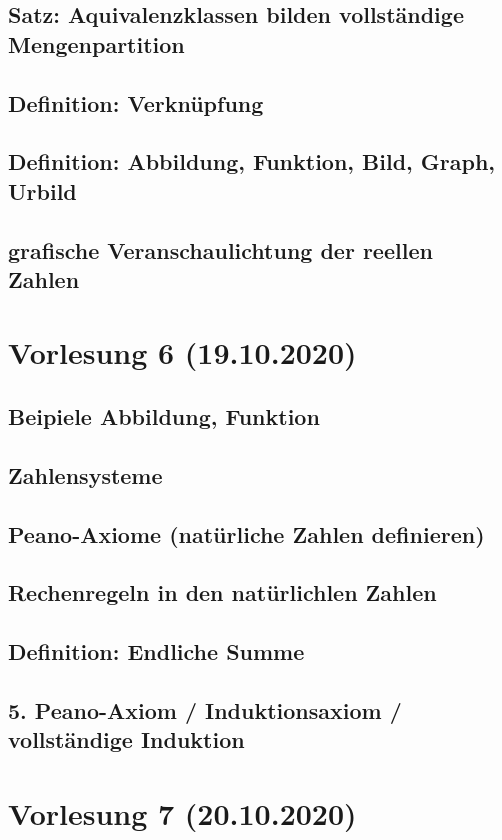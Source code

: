 \documentclass[]{article}
\begin{document}
\subsection{Satz: Aquivalenzklassen bilden vollständige Mengenpartition}
\subsection{Definition: Verknüpfung}
\subsection{Definition: Abbildung, Funktion, Bild, Graph, Urbild}
\subsection{grafische Veranschaulichtung der reellen Zahlen}


\section{Vorlesung 6 (19.10.2020)}
\subsection{Beipiele Abbildung, Funktion}
\subsection{Zahlensysteme}
\subsection{Peano-Axiome (natürliche Zahlen definieren)}
\subsection{Rechenregeln in den natürlichlen Zahlen}
\subsection{Definition: Endliche Summe}
\subsection{5. Peano-Axiom / Induktionsaxiom / vollständige Induktion}


\section{Vorlesung 7 (20.10.2020)}
\end{document}
